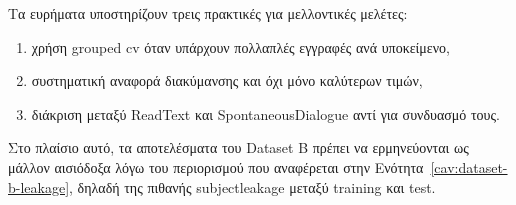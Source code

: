 Τα ευρήματα υποστηρίζουν τρεις πρακτικές για μελλοντικές μελέτες:
\begin{enumerate}
    \item χρήση grouped \gls{cv} όταν υπάρχουν πολλαπλές εγγραφές ανά υποκείμενο,
    \item συστηματική αναφορά διακύμανσης και όχι μόνο καλύτερων τιμών,
    \item διάκριση μεταξύ ReadText και SpontaneousDialogue αντί για συνδυασμό τους.
\end{enumerate}

Στο πλαίσιο αυτό, τα αποτελέσματα του Dataset B πρέπει να ερμηνεύονται ως μάλλον αισιόδοξα λόγω του περιορισμού που αναφέρεται στην Ενότητα~\ref{cav:dataset-b-leakage}, 
δηλαδή της πιθανής \gls{subjectleakage} μεταξύ training και test.
